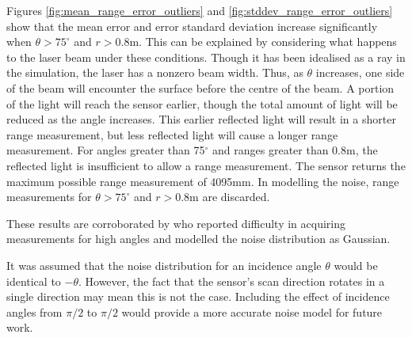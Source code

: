		Figures \ref{fig:mean_range_error_outliers} and \ref{fig:stddev_range_error_outliers} show that the mean error and error standard deviation increase significantly when $\theta > 75^\circ$ and $r > 0.8$m. This can be explained by considering what happens to the laser beam under these conditions. Though it has been idealised as a ray in the simulation, the laser has a nonzero beam width. Thus, as $\theta$ increases, one side of the beam will encounter the surface before the centre of the beam. A portion of the light will reach the sensor earlier, though the total amount of light will be reduced as the angle increases. This earlier reflected light will result in a shorter range measurement, but less reflected light will cause a longer range measurement. For angles greater than 75$^\circ$ and ranges greater than 0.8m, the reflected light is insufficient to allow a range measurement. The sensor returns the maximum possible range measurement of 4095mm. In modelling the noise, range measurements for $\theta > 75^\circ$ and $r > 0.8$m are discarded.
		
		These results are corroborated by \cite{park2010characterization} who reported difficulty in acquiring measurements for high angles and modelled the noise distribution as Gaussian.
		
		It was assumed that the noise distribution for an incidence angle $\theta$ would be identical to $-\theta$. However, the fact that the sensor's scan direction rotates in a single direction may mean this is not the case. Including the effect of incidence angles from $\pi/2$ to $\pi/2$ would provide a more accurate noise model for future work.
		
